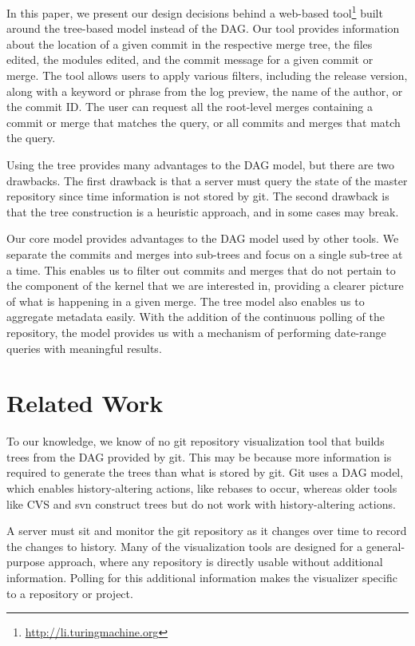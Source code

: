 \documentclass[conference, draftclsnofoot, draft]{IEEEtran}
\begin{document}
In this paper, we present our design decisions behind a web-based
tool\footnote{\url{http://li.turingmachine.org}} built around the tree-based model
instead of the DAG. Our tool provides information about the location of a given
commit in the respective merge tree, the files edited, the modules edited, and the
commit message for a given commit or merge. The tool allows users to apply various
filters, including the release version, along with a keyword or phrase from the log
preview, the name of the author, or the commit ID. The user can request all the
root-level merges containing a commit or merge that matches the query, or all
commits and merges that match the query.

Using the tree provides many advantages to the DAG model, but there are two
drawbacks. The first drawback is that a server must query the state of the master
repository since time information is not stored by git. The second drawback is that
the tree construction is a heuristic approach, and in some cases may break.

Our core model provides advantages to the DAG model used by other tools. We separate
the commits and merges into sub-trees and focus on a single sub-tree at a time. This
enables us to filter out commits and merges that do not pertain to the component of
the kernel that we are interested in, providing a clearer picture of what is
happening in a given merge. The tree model also enables us to aggregate metadata
easily. With the addition of the continuous polling of the repository, the model
provides us with a mechanism of performing date-range queries with meaningful
results.



\section{Related Work}

To our knowledge, we know of no git repository visualization tool that builds
trees from the DAG provided by git. This may be because more information is required
to generate the trees than what is stored by git. Git uses a DAG model, which
enables history-altering actions, like rebases to occur, whereas older tools like
CVS and svn construct trees\cite{CVS2008} but do not work with history-altering
actions.

A server must sit and monitor the git repository as it changes over time to record
the changes to history. Many of the visualization tools are designed for a
general-purpose approach, where any repository is directly usable without additional
information. Polling for this additional information makes the visualizer specific
to a repository or project.
\end{document}
